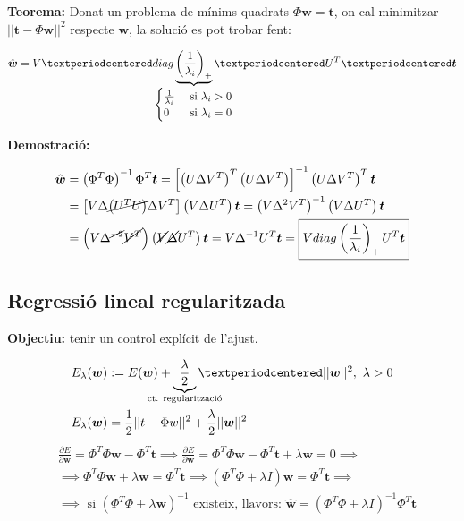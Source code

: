 \textbf{Teorema:} Donat un problema de mínims quadrats $ \Phi \boldsymbol{w} = \boldsymbol{t} $, on cal minimitzar $ ||\boldsymbol{t} - \Phi \boldsymbol{w} ||^2 $ respecte $\boldsymbol{w}$, la solució es pot trobar fent:

$$
\hat{\boldsymbol{w}} = V · diag \underbrace{\left( \frac{1}{\lambda_i}\right)_+}_{
	\mathclap{
		\begin{cases}
			\frac{1}{\lambda_i} &\text{ si } \lambda_i > 0 \\
			0 & \text{ si } \lambda_i = 0
		\end{cases}}} · U^T · \boldsymbol{t}
$$

\textbf{Demostració:}

\begin{align*}
\hat{\boldsymbol{w}} &= \left( \Phi^T \Phi \right)^{-1} \Phi^T \boldsymbol{t} =
\left[ \left( U \Delta V^T \right)^T \left( U\Delta V^T \right) \right]^{-1}
\left(U\Delta V^T\right)^T \boldsymbol{t} \\
& = \left[ V\Delta \cancel{\left( U^T U \right)} \Delta V^T \right] 
\left( V \Delta U^T \right) \boldsymbol{t} = 
\left( V \Delta^2 V^T \right)^{-1} \left( V \Delta U^T \right) \boldsymbol{t} \\ 
&=
\left( V \Delta^{\cancel{-2}} \cancel{V^T} \right) \left( \cancel{V} \cancel{\Delta} U^T \right) \boldsymbol{t} =
V \Delta^{-1} U^T \boldsymbol{t} = 
\boxed{V diag\left(\frac{1}{\lambda_i}\right)_+ U^T \boldsymbol{t}}
\end{align*}

\subsection{Regressió lineal regularitzada}

\textbf{Objectiu:} tenir un control explícit de l'ajust.

\begin{align*}
    & E_{\lambda} (\boldsymbol{w}) := E(\boldsymbol{w}) + \underbrace{\frac{\lambda}{2}}_{\mathclap{\text{ct. regularització}}}·||\boldsymbol{w}||^2, \ \lambda > 0 \\
    & E_{\lambda}(\boldsymbol{w}) = \frac{1}{2} || t - \Phi w ||^2 + \frac{\lambda}{2} || \boldsymbol{w} ||^2
\end{align*}
\begin{align*}
    & \frac{\partial E}{\partial \boldsymbol{w}} = 
    \Phi^T \Phi \boldsymbol{w} - \Phi^T \boldsymbol{t} \implies
    \frac{\partial E}{\partial \boldsymbol{w}} = 
    \Phi^T \Phi \boldsymbol{w} - \Phi^T \boldsymbol{t} + \lambda \boldsymbol{w} = 0 \implies \\
    & \implies \Phi^T \Phi \boldsymbol{w} + \lambda \boldsymbol{w} = \Phi^T \boldsymbol{t} \implies
    \left( \Phi^T \Phi + \lambda I \right) \boldsymbol{w} = \Phi^T \boldsymbol{t} \implies \\
    & \implies \text{ si } \left( \Phi^T \Phi + \lambda \boldsymbol{w} \right)^{-1} 
    \text{ existeix, llavors: } \hat{\boldsymbol{w}} = 
    \left( \Phi^T \Phi + \lambda I \right)^{-1} \Phi^T \boldsymbol{t}
\end{align*}


